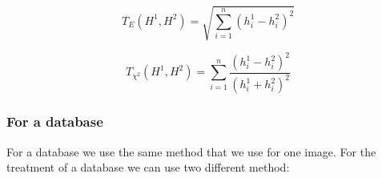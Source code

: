 \documentclass[12pt]{article}
\begin{document}
\begin{equation}
T_{E}(H^1,H^2) = \sqrt{\sum_{i=1}^{n} (h_{i}^{1} - h_{i}^{2})^2}
\label{Disteuclid}
\end{equation}

\begin{equation}
T_{\chi^2}(H^1,H^2) = \sum_{i=1}^{n} \frac{(h_{i}^{1} - h_{i}^{2})^2}{(h_{i}^{1} + h_{i}^{2})^2}
\label{Distki}
\end{equation}

\vspace{2cm}

\subsubsection{For a database}
For a database we use the same method that we use for one image. For the treatment of a database we can use two different method:
\end{document}
